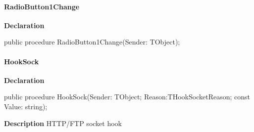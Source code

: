 \documentclass{report}
\newif\ifpdf
\begin{document}
\paragraph*{RadioButton1Change}\hspace*{\fill}

\label{igobase.TIWizFrm-RadioButton1Change}
\begin{list}{}{
\setlength{\itemindent}{0cm}
\setlength{\listparindent}{0cm}
\setlength{\leftmargin}{\evensidemargin}
\addtolength{\leftmargin}{\tmplength}
\settowidth{\labelsep}{X}
\addtolength{\leftmargin}{\labelsep}
\setlength{\labelwidth}{\tmplength}
}
\item[\textbf{Declaration}\hfill]
\ifpdf
\begin{flushleft}
\fi
\begin{ttfamily}
public procedure RadioButton1Change(Sender: TObject);\end{ttfamily}

\ifpdf
\end{flushleft}
\fi

\end{list}
\paragraph*{HookSock}\hspace*{\fill}

\label{igobase.TIWizFrm-HookSock}
\begin{list}{}{
\setlength{\itemindent}{0cm}
\setlength{\listparindent}{0cm}
\setlength{\leftmargin}{\evensidemargin}
\addtolength{\leftmargin}{\tmplength}
\settowidth{\labelsep}{X}
\addtolength{\leftmargin}{\labelsep}
\setlength{\labelwidth}{\tmplength}
}
\item[\textbf{Declaration}\hfill]
\ifpdf
\begin{flushleft}
\fi
\begin{ttfamily}
public procedure HookSock(Sender: TObject; Reason:THookSocketReason; const Value: string);\end{ttfamily}

\ifpdf
\end{flushleft}
\fi

\par
\item[\textbf{Description}]
HTTP/FTP socket hook

\end{list}
\end{document}

